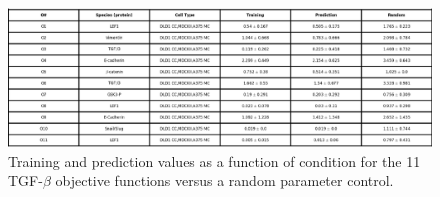 
\begin{figure}
	\center
	\includegraphics [width=1.0\linewidth] {./figs/Fig-Supplemental-Error-Table.pdf}
	\caption{Training and prediction values as a function of condition for the 11 TGF-$\beta$ objective functions versus a random parameter control.}\label{fg:ObjTable}
\end{figure}

